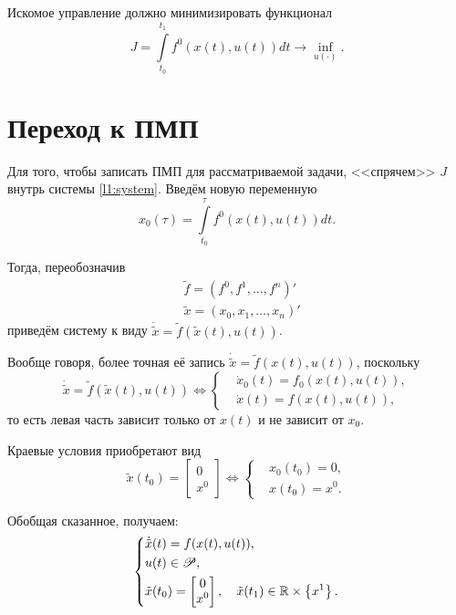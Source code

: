 Искомое управление должно минимизировать функционал
$$
J = \int\limits_{t_0}^{t_1} f^0(x(t), u(t)) dt \to \inf\limits_{u(\cdot)}.
$$

\section*{Переход к ПМП}
Для того, чтобы записать ПМП для рассматриваемой задачи, <<спрячем>> $J$ внутрь системы \eqref{l1:system}. Введём новую переменную
$$
    x_0(\tau) = \int\limits_{t_0}^{\tau} f^0(x(t), u(t)) dt.
$$

Тогда, переобозначив
$$
\begin{aligned}
    & \tilde{f} = (f^0, f^1, \ldots, f^n)' \\
    & \tilde{x} = (x_0, x_1, \ldots, x_n)'
\end{aligned}
$$
приведём систему к виду $\dot{\tilde{x}} = \tilde{f}(\tilde{x}(t), u(t))$.

Вообще говоря, более точная её запись $\dot{\tilde{x}} = \tilde{f}(x(t), u(t))$, поскольку 
$$
\dot{\tilde{x}} = \tilde{f}(\tilde{x}(t), u(t)) \Leftrightarrow
    \left\{
        \begin{aligned}
            & \dot{x}_0(t) = f_0(x(t), u(t)), \\
            & \dot{x}(t) = f(x(t), u(t)),
        \end{aligned}
    \right.
$$
то есть левая часть зависит только от $x(t)$ и не зависит от $x_0$.

Краевые условия приобретают вид
$$
\tilde{x}(t_0) = \begin{bmatrix} 0 \\ x^0 \end{bmatrix}
\Leftrightarrow
\left\{
    \begin{aligned}
        & x_0(t_0) = 0, \\
        & x(t_0) = x^0.
    \end{aligned}
\right.
$$

Обобщая сказанное, получаем:
\begin{equation}\label{l1:system}
    \left\{
        \begin{aligned}
            & \dot{\tilde{x}}(t) = f(x(t), u(t)), \\
            & u(t) \in \mathscr{P}, \\
            & \tilde{x}(t_0) = \begin{bmatrix} 0 \\ x^0 \end{bmatrix}, \quad \tilde{x}(t_1) \in \mathbb{R} \times \left\{ x^1 \right\}.
        \end{aligned}
    \right.
\end{equation}

